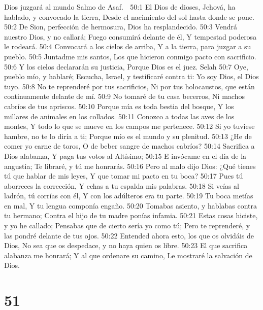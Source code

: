 Dios juzgará al mundo 
Salmo de Asaf. 

50:1 El Dios de dioses, Jehová, ha hablado, y convocado la tierra, 
Desde el nacimiento del sol hasta donde se pone. 
50:2 De Sion, perfección de hermosura, 
Dios ha resplandecido. 
50:3 Vendrá nuestro Dios, y no callará; 
Fuego consumirá delante de él, 
Y tempestad poderosa le rodeará. 
50:4 Convocará a los cielos de arriba, 
Y a la tierra, para juzgar a su pueblo. 
50:5 Juntadme mis santos, 
Los que hicieron conmigo pacto con sacrificio. 
50:6 Y los cielos declararán su justicia, 
Porque Dios es el juez. Selah 
50:7 Oye, pueblo mío, y hablaré; 
Escucha, Israel, y testificaré contra ti: 
Yo soy Dios, el Dios tuyo. 
50:8 No te reprenderé por tus sacrificios, 
Ni por tus holocaustos, que están continuamente delante de mí. 
50:9 No tomaré de tu casa becerros, 
Ni machos cabríos de tus apriscos. 
50:10 Porque mía es toda bestia del bosque, 
Y los millares de animales en los collados. 
50:11 Conozco a todas las aves de los montes, 
Y todo lo que se mueve en los campos me pertenece. 
50:12 Si yo tuviese hambre, no te lo diría a ti; 
Porque mío es el mundo y su plenitud. 
50:13 ¿He de comer yo carne de toros, 
O de beber sangre de machos cabríos? 
50:14 Sacrifica a Dios alabanza, 
Y paga tus votos al Altísimo; 
50:15 E invócame en el día de la angustia; 
Te libraré, y tú me honrarás. 
50:16 Pero al malo dijo Dios: 
¿Qué tienes tú que hablar de mis leyes, 
Y que tomar mi pacto en tu boca? 
50:17 Pues tú aborreces la corrección, 
Y echas a tu espalda mis palabras. 
50:18 Si veías al ladrón, tú corrías con él, 
Y con los adúlteros era tu parte. 
50:19 Tu boca metías en mal, 
Y tu lengua componía engaño. 
50:20 Tomabas asiento, y hablabas contra tu hermano; 
Contra el hijo de tu madre ponías infamia. 
50:21 Estas cosas hiciste, y yo he callado; 
Pensabas que de cierto sería yo como tú; 
Pero te reprenderé, y las pondré delante de tus ojos. 
50:22 Entended ahora esto, los que os olvidáis de Dios, 
No sea que os despedace, y no haya quien os libre. 
50:23 El que sacrifica alabanza me honrará; 
Y al que ordenare su camino, 
Le mostraré la salvación de Dios. 

\chapter{51}

